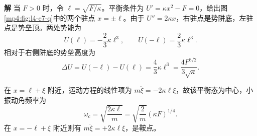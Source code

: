 \documentclass[11pt,openany,fontset=fandol]{ctexbook}
\theoremstyle{definition}\newtheorem{example}{例}[chapter]\newtheorem{exercise}{习题}[chapter]
\newcommand{\SolutionStart}{\par\medskip\ifdim\pagetotal>0pt\ifdim\dimexpr\pagegoal-\pagetotal\relax<3\baselineskip\newpage\fi\fi\noindent\textbf{解}\quad\ignorespaces}
\newenvironment{solution}{\SolutionStart}{\par\medskip}
\begin{document}
\begin{solution}
当 $F>0$ 时，令 $\ell=\sqrt{F/\kappa}$。平衡条件为 $U'=\kappa x^2-F=0$，给出图\ref{mp4:fig:l4-e7-q}中的两个驻点 $x=\pm\ell$。由于 $U''=2\kappa x$，右驻点是势阱底，左驻点是势垒顶。两处势能为
\[
U(\ell)=-\frac23\kappa\ell^3,
\qquad U(-\ell)=\frac23\kappa\ell^3.
\]
相对于右侧阱底的势垒高度为
\[
\Delta U=U(-\ell)-U(\ell)
=\frac43\kappa\ell^3=\frac{4F^{3/2}}{3\sqrt\kappa}.
\]

在 $x=\ell+\xi$ 附近，运动方程的线性项为 $m\ddot\xi=-2\kappa\ell\xi$，故该平衡态为中心，小振动角频率为
\[
\omega_c=\sqrt{\frac{2\kappa\ell}{m}}
=\sqrt{\frac2m}(\kappa F)^{1/4}.
\]
在 $x=-\ell+\xi$ 附近则有 $m\ddot\xi=+2\kappa\ell\xi$，是鞍点。

\begin{figure}[H]\centering
{}
\end{figure}
\end{solution}
\end{document}
